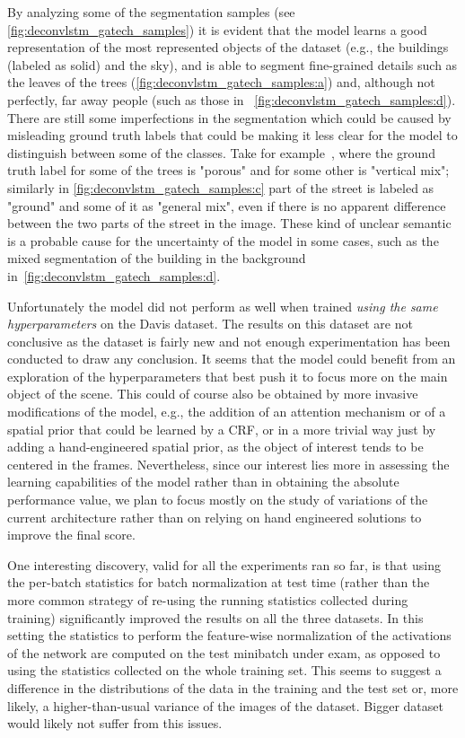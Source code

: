 By analyzing some of the segmentation samples (see
\autoref{fig:deconvlstm_gatech_samples}) it is evident that the model learns a
good representation of the most represented objects of the dataset (e.g., the
buildings (labeled as solid) and the sky), and is able to segment fine-grained
details such as the leaves of the trees
(\autoref{fig:deconvlstm_gatech_samples:a}) and, although not perfectly, far
away people (such as those in ~\autoref{fig:deconvlstm_gatech_samples:d}).
There are still some imperfections in the segmentation which could be caused by
misleading ground truth labels that could be making it less clear for the model
to distinguish between some of the classes. Take for
example~, where the ground truth label for some of the
trees is "porous" and for some other is "vertical mix"; similarly in
\autoref{fig:deconvlstm_gatech_samples:c} part of the street is labeled as
"ground" and some of it as "general mix", even if there is no apparent
difference between the two parts of the street in the image. These kind of
unclear semantic is a probable cause for the uncertainty of the model in some
cases, such as the mixed segmentation of the building in the background
in~\autoref{fig:deconvlstm_gatech_samples:d}.

Unfortunately the model did not perform as well when trained \emph{using the
same hyperparameters} on the Davis dataset. The results on this dataset are not
conclusive as the dataset is fairly new and not enough experimentation has been
conducted to draw any conclusion. It seems that the model could benefit from an
exploration of the hyperparameters that best push it to focus more on the main
object of the scene. This could of course also be obtained by more invasive
modifications of the model, e.g., the addition of an attention mechanism or of
a spatial prior that could be learned by a CRF, or in a more trivial way just
by adding a hand-engineered spatial prior, as the object of interest tends to
be centered in the frames. Nevertheless, since our interest lies more in
assessing the learning capabilities of the model rather than in obtaining the
absolute performance value, we plan to focus mostly on the study of variations
of the current architecture rather than on relying on hand engineered solutions
to improve the final score.

One interesting discovery, valid for all the experiments ran so far, is that
using the per-batch statistics for batch normalization at test time (rather
than the more common strategy of re-using the running statistics collected
during training) significantly improved the results on all the three datasets.
In this setting the statistics to perform the feature-wise normalization of the
activations of the network are computed on the test minibatch under exam,
as opposed to using the statistics collected on the whole training set. This
seems to suggest a difference in the distributions of the data in the training
and the test set or, more likely, a higher-than-usual variance of the images
of the dataset. Bigger dataset would likely not suffer from this issues.


